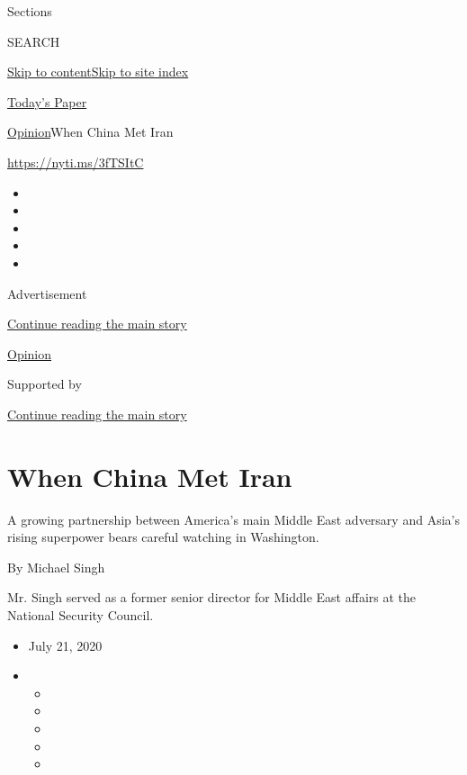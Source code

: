 Sections

SEARCH

\protect\hyperlink{site-content}{Skip to
content}\protect\hyperlink{site-index}{Skip to site index}

\href{https://myaccount.nytimes3xbfgragh.onion/auth/login?response_type=cookie\&client_id=vi}{}

\href{https://www.nytimes3xbfgragh.onion/section/todayspaper}{Today's
Paper}

\href{/section/opinion}{Opinion}\textbar{}When China Met Iran

\url{https://nyti.ms/3fTSItC}

\begin{itemize}
\item
\item
\item
\item
\item
\end{itemize}

Advertisement

\protect\hyperlink{after-top}{Continue reading the main story}

\href{/section/opinion}{Opinion}

Supported by

\protect\hyperlink{after-sponsor}{Continue reading the main story}

\hypertarget{when-china-met-iran}{%
\section{When China Met Iran}\label{when-china-met-iran}}

A growing partnership between America's main Middle East adversary and
Asia's rising superpower bears careful watching in Washington.

By Michael Singh

Mr. Singh served as a former senior director for Middle East affairs at
the National Security Council.

\begin{itemize}
\item
  July 21, 2020
\item
  \begin{itemize}
  \item
  \item
  \item
  \item
  \item
  \end{itemize}
\end{itemize}

